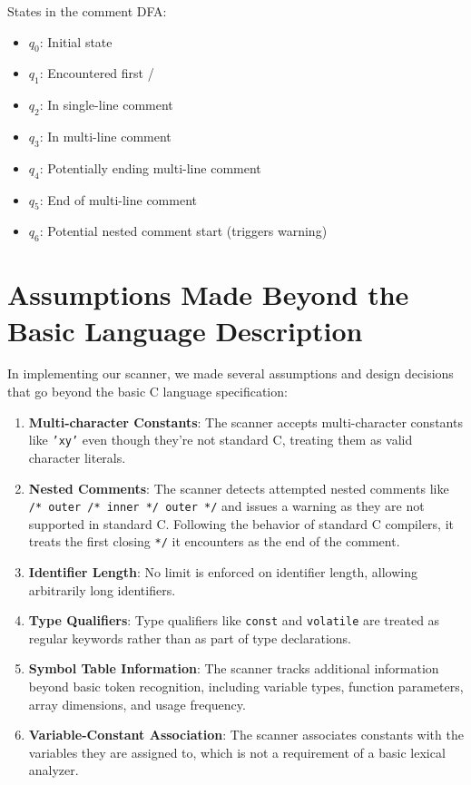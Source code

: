 \documentclass[12pt]{article}
\begin{document}
States in the comment DFA:
\begin{itemize}
    \item $q_0$: Initial state
    \item $q_1$: Encountered first /
    \item $q_2$: In single-line comment
    \item $q_3$: In multi-line comment
    \item $q_4$: Potentially ending multi-line comment
    \item $q_5$: End of multi-line comment
    \item $q_6$: Potential nested comment start (triggers warning)
\end{itemize}

\section{Assumptions Made Beyond the Basic Language Description}

In implementing our scanner, we made several assumptions and design decisions that go beyond the basic C language specification:

\begin{enumerate}
    \item \textbf{Multi-character Constants}: The scanner accepts multi-character constants like \texttt{'xy'} even though they're not standard C, treating them as valid character literals.
    
    \item \textbf{Nested Comments}: The scanner detects attempted nested comments like \texttt{/* outer /* inner */ outer */} and issues a warning as they are not supported in standard C. Following the behavior of standard C compilers, it treats the first closing \texttt{*/} it encounters as the end of the comment.
    
    \item \textbf{Identifier Length}: No limit is enforced on identifier length, allowing arbitrarily long identifiers.
    
    \item \textbf{Type Qualifiers}: Type qualifiers like \texttt{const} and \texttt{volatile} are treated as regular keywords rather than as part of type declarations.
    
    \item \textbf{Symbol Table Information}: The scanner tracks additional information beyond basic token recognition, including variable types, function parameters, array dimensions, and usage frequency.
    
    \item \textbf{Variable-Constant Association}: The scanner associates constants with the variables they are assigned to, which is not a requirement of a basic lexical analyzer.
\end{enumerate}
\end{document}
